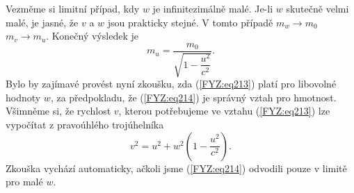 {    Vezměme si limitní případ, kdy \(w\) je infinitezimálně malé. Je-li \(w\) skutečně velmi malé, 
    je jasné, že \(v\) a \(w\) jsou prakticky stejné. V tomto případě \(m_w \rightarrow m_0\)  
    \(m_v \rightarrow m_u\). Konečný výsledek je
    \begin{equation}\label{FYZ:eq214}
      m_u = \frac{m_0}{\sqrt{1 - \dfrac{u^2}{c^2}}}.
    \end{equation}
    Bylo by zajímavé provést nyní zkoušku, zda (\ref{FYZ:eq213}) platí pro libovolné hodnoty \(w\), 
    za předpokladu, že (\ref{FYZ:eq214}) je správný vztah pro hmotnost. Všimněme si, že rychlost 
    \(v\), kterou potřebujeme ve vztahu (\ref{FYZ:eq213}) lze vypočítat z pravoúhlého trojúhelníka
    \begin{equation}\label{FYZ:eq215}
      v^2 = u^2 + w^2\left(1 - \dfrac{u^2}{c^2}\right).
    \end{equation}
    Zkouška vychází automaticky, ačkoli jsme (\ref{FYZ:eq214}) odvodili pouze v limitě pro malé 
    \(w\).
    
}
